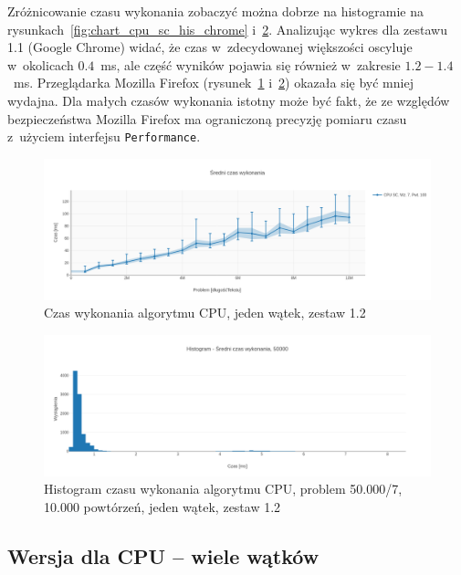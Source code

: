 Zróżnicowanie czasu wykonania zobaczyć można dobrze na histogramie na rysunkach~\ref{fig:chart_cpu_sc_his_chrome} i~\ref{fig:chart_cpu_sc_his_firefox}. Analizując wykres dla zestawu 1.1 (Google Chrome) widać, że czas w~zdecydowanej większości oscyluje w~okolicach $0.4$~ms, ale część wyników pojawia się również w~zakresie $1.2-1.4$~ms. Przeglądarka Mozilla Firefox (rysunek~\ref{fig:chart_cpu_sc_mean_firefox} i~\ref{fig:chart_cpu_sc_his_firefox}) okazała się być mniej wydajna. Dla małych czasów wykonania istotny może być fakt, że ze względów bezpieczeństwa Mozilla Firefox ma ograniczoną precyzję pomiaru czasu z~użyciem interfejsu \texttt{Performance}.


\begin{figure}
    \centering
    \includegraphics[keepaspectratio, width=1.0\linewidth, trim=1.1cm 0.9cm 0.5cm 3.5cm, clip]{benchmarks/nvidia970_firefox/cpu_sc_mean.png}
    \caption{Czas wykonania algorytmu CPU, jeden wątek, zestaw 1.2}
    \label{fig:chart_cpu_sc_mean_firefox}
\end{figure}

\begin{figure}
    \centering
    \includegraphics[keepaspectratio, width=1.0\linewidth, trim=1.1cm 0.9cm 0.5cm 3.5cm, clip]{benchmarks/nvidia970_firefox/his.png}
    \caption{Histogram czasu wykonania algorytmu CPU, problem 50.000/7, 10.000 powtórzeń, jeden wątek, zestaw 1.2}
    \label{fig:chart_cpu_sc_his_firefox}
\end{figure}

\subsection{Wersja dla CPU -- wiele wątków}

